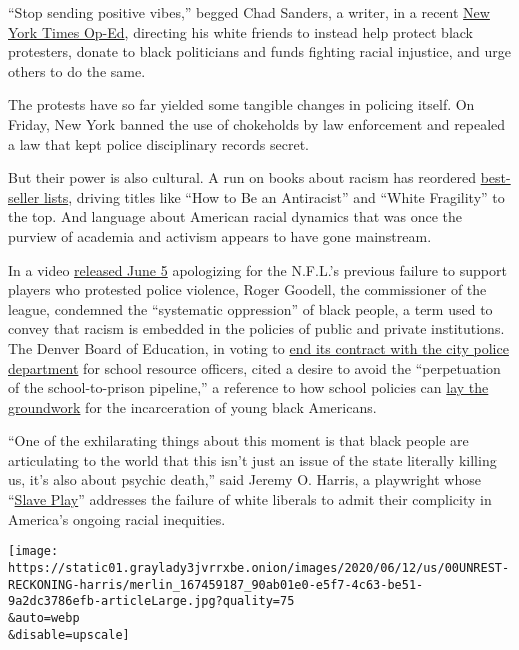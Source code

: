 ``Stop sending positive vibes,'' begged Chad Sanders, a writer, in a
recent
\href{https://www.nytimes3xbfgragh.onion/2020/06/05/opinion/whites-anti-blackness-protests.html}{New
York Times Op-Ed}, directing his white friends to instead help protect
black protesters, donate to black politicians and funds fighting racial
injustice, and urge others to do the same.

The protests have so far yielded some tangible changes in policing
itself. On Friday, New York banned the use of chokeholds by law
enforcement and repealed a law that kept police disciplinary records
secret.

But their power is also cultural. A run on books about racism has
reordered
\href{https://www.nytimes3xbfgragh.onion/2020/06/05/books/antiracism-books-race-racism.html}{best-seller
lists}, driving titles like ``How to Be an Antiracist'' and ``White
Fragility'' to the top. And language about American racial dynamics that
was once the purview of academia and activism appears to have gone
mainstream.

In a video
\href{https://twitter.com/NFL/status/1269034074552721408}{released June
5} apologizing for the N.F.L.'s previous failure to support players who
protested police violence, Roger Goodell, the commissioner of the
league, condemned the ``systematic oppression'' of black people, a term
used to convey that racism is embedded in the policies of public and
private institutions. The Denver Board of Education, in voting to
\href{https://www.nytimes3xbfgragh.onion/2020/06/12/us/schools-police-resource-officers.html}{end
its contract with the city police department} for school resource
officers, cited a desire to avoid the ``perpetuation of the
school-to-prison pipeline,'' a reference to how school policies can
\href{https://www.nytimes3xbfgragh.onion/2020/04/04/us/politics/black-girls-school-racism.html}{lay
the groundwork} for the incarceration of young black Americans.

``One of the exhilarating things about this moment is that black people
are articulating to the world that this isn't just an issue of the state
literally killing us, it's also about psychic death,'' said Jeremy O.
Harris, a playwright whose
``\href{https://www.nytimes3xbfgragh.onion/2020/01/27/theater/slave-play-broadway-interviews.html}{Slave
Play}'' addresses the failure of white liberals to admit their
complicity in America's ongoing racial inequities.

\texttt{[image: https://static01.graylady3jvrrxbe.onion/images/2020/06/12/us/00UNREST-RECKONING-harris/merlin\_167459187\_90ab01e0-e5f7-4c63-be51-9a2dc3786efb-articleLarge.jpg?quality=75\\\&auto=webp\\\&disable=upscale]}


